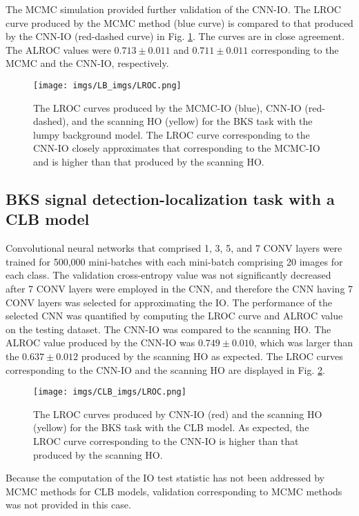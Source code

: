 \documentclass[journal]{IEEEtran}
\begin{document}
The MCMC simulation provided further validation of the CNN-IO.
 The LROC curve produced by the MCMC method (blue curve) is compared to that produced by the CNN-IO (red-dashed curve) in Fig. \ref{fig:LB}. The curves are in close agreement.
 The ALROC values were $0.713\pm {0.011}$ and $0.711\pm {0.011}$ corresponding to the MCMC and the CNN-IO, respectively.
\begin{figure}[ht]
  \centering
 \texttt{[image: imgs/LB\_imgs/LROC.png]}
  \vspace{-0.3cm}
   \caption{The LROC curves produced by the MCMC-IO (blue), CNN-IO (red-dashed), and the scanning HO (yellow) for the BKS task with the lumpy background model. The LROC curve corresponding to the CNN-IO closely approximates that corresponding to the MCMC-IO and is higher than that produced by the scanning HO.}
     \vspace{-0.45cm}
   \label{fig:LB}
\end{figure}


  \vspace{-0.2cm}
\subsection{BKS signal detection-localization task with a CLB model}
 \vspace{-0.1cm}
Convolutional neural networks that comprised 1, 3, 5, and 7 CONV layers were trained for 500,000 mini-batches with each mini-batch comprising 20 images for each class. 
The validation cross-entropy value was not significantly decreased after 7 CONV layers were employed in the CNN, and therefore the CNN having 7 CONV layers 
was selected for approximating the IO.
The performance of the selected CNN was quantified by computing the LROC curve and ALROC value on the testing dataset.
The CNN-IO was compared to the scanning HO. The ALROC value produced by the CNN-IO  was $0.749\pm {0.010}$,
which was larger than the $0.637\pm {0.012}$ produced by the scanning HO as expected.
The LROC curves corresponding to the CNN-IO and the scanning HO are displayed in Fig. \ref{fig:CLB}.
\vspace{-0.6cm}
\begin{figure}[H]
  \centering
 \texttt{[image: imgs/CLB\_imgs/LROC.png]}
 \vspace{-0.3cm}
   \caption{The LROC curves produced by CNN-IO (red) and the scanning HO (yellow) for the BKS task with the CLB model. As expected, the LROC curve corresponding to the CNN-IO is higher than that produced by the scanning HO.}
   \label{fig:CLB}
\end{figure}
Because the computation of the IO test statistic has not been addressed by MCMC methods for CLB models, 
validation corresponding to MCMC methods was not provided in this case.
\end{document}
